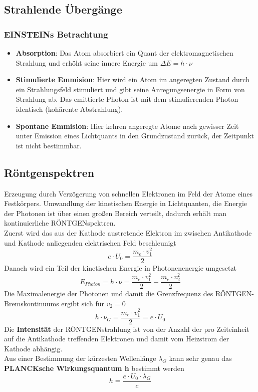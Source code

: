 \documentclass[12pt,a4paper,ngerman]{article}
\begin{document}
\subsection{Strahlende Übergänge}
\subsubsection*{EINSTEINs Betrachtung}
\begin{itemize}
\item \textbf{Absorption}: Das Atom absorbiert ein Quant der elektromagnetischen Strahlung und erhöht seine innere Energie um $\Delta E = h \cdot \nu$
\item \textbf{Stimulierte Emmision}: Hier wird ein Atom im angeregten Zustand durch ein Strahlungsfeld stimuliert und gibt seine Anregungsenergie in Form von Strahlung ab. Das emittierte Photon ist mit dem stimulierenden Photon identisch (kohärente Abstrahlung). 
\item \textbf{Spontane Emmision}: Hier kehren angeregte Atome nach gewisser Zeit unter Emission eines Lichtquants in den Grundzustand zurück, der Zeitpunkt ist nicht bestimmbar.
\end{itemize}

\subsection{Röntgenspektren}
Erzeugung durch Verzögerung von schnellen Elektronen im Feld der Atome eines Festkörpers. Umwandlung der kinetischen Energie in Lichtquanten, die Energie der Photonen ist über einen großen Bereich verteilt, dadurch erhält man kontinuierliche RÖNTGENspektren. \\
Zuerst wird das aus der Kathode austretende Elektron im zwischen Antikathode und Kathode anliegenden elektrischen Feld beschleunigt
\begin{equation}
e \cdot U_0 = \frac{m_e \cdot v_1^2}{2}
\end{equation}
Danach wird ein Teil der kinetischen Energie in Photonenenergie umgesetzt
\begin{equation}
E_{Photon} = h \cdot \nu = \frac{m_e \cdot v_1^2}{2}- \frac{m_e \cdot v_2^2}{2}
\end{equation}
Die Maximalenergie der Photonen und damit die Grenzfrequenz des RÖNTGEN-Bremskontinuums ergibt sich für $v_2 = 0$
\begin{equation}
h \cdot \nu_G = \frac{m_e \cdot v_1^2}{2} = e \cdot U_0
\end{equation}
Die \textbf{Intensität} der RÖNTGENstrahlung ist von der Anzahl der pro Zeiteinheit auf die Antikathode treffenden Elektronen und damit vom Heizstrom der Kathode abhängig.
\\
Aus einer Bestimmung der kürzesten Wellenlänge $\lambda_G$ kann sehr genau das \textbf{PLANCKsche Wirkungsquantum h} bestimmt werden
\begin{equation}
h = \frac{e \cdot U_0 \cdot \lambda_G}{c}
\end{equation}
\end{document}

